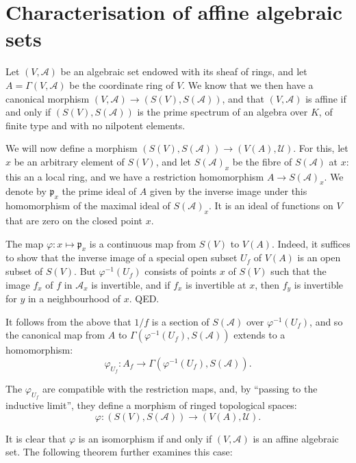 \documentclass{article}
\theoremstyle{plain}
\theoremstyle{definition}
\newcommand{\sh}{\mathscr}
\newcommand{\oldpage}[1]{\marginpar{\footnotesize$\Big\vert$ \textit{p.~#1}}}
\begin{document}
\section{Characterisation of affine algebraic sets}
\label{section4}

Let $(V,\sh{A})$ be an algebraic set endowed with its sheaf of rings, and let $A=\Gamma(V,\sh{A})$ be the coordinate ring of $V$.
We know that we then have a canonical morphism $(V,\sh{A})\to(S(V),S(\sh{A}))$, and that $(V,\sh{A})$ is affine if and only if $(S(V),S(\sh{A}))$ is the prime spectrum of an algebra over $K$, of finite type and with no nilpotent elements.

We will now define a morphism $(S(V),S(\sh{A}))\to(V(A),\sh{U})$.
For this, let $x$ be an arbitrary element of $S(V)$, and let $S(\sh{A})_x$ be the fibre of $S(\sh{A})$ at $x$: this an a local ring, and we have a restriction homomorphism $A\to S(\sh{A})_x$.
We denote by $\mathfrak{p}_x$ the prime ideal of $A$ given by the inverse image under this homomorphism of the maximal ideal of $S(\sh{A})_x$.
It is an ideal of functions on $V$ that are zero on the closed point $x$.

The map $\varphi\colon x\mapsto\mathfrak{p}_x$ is a continuous map from $S(V)$ to $V(A)$.
Indeed, it suffices to show that the inverse image of a special open subset $U_f$ of $V(A)$ is an open subset of $S(V)$.
But $\varphi^{-1}(U_f)$ consists of points $x$ of $S(V)$ such that the image $f_x$ of $f$ in $\sh{A}_x$ is invertible, and if $f_x$ is invertible at $x$, then $f_y$ is invertible for $y$ in a neighbourhood of $x$.
QED.

It follows from the above that $1/f$ is a section of $S(\sh{A})$ over $\varphi^{-1}(U_f)$, and so the canonical map from $A$ to $\Gamma(\varphi^{-1}(U_f),S(\sh{A}))$ extends to a homomorphism:
\[
  \varphi_{U_f}\colon A_f \to \Gamma(\varphi^{-1}(U_f), S(\sh{A})).
\]

The $\varphi_{U_f}$ are compatible with the restriction maps, and, by ``passing to the inductive limit'', they define a morphism of ringed topological spaces:
\oldpage{2-05}
\[
  \varphi\colon (S(V),S(\sh{A})) \to (V(A),\sh{U}).
\]

It is clear that $\varphi$ is an isomorphism if and only if $(V,\sh{A})$ is an affine algebraic set.
The following theorem further examines this case:
\end{document}
